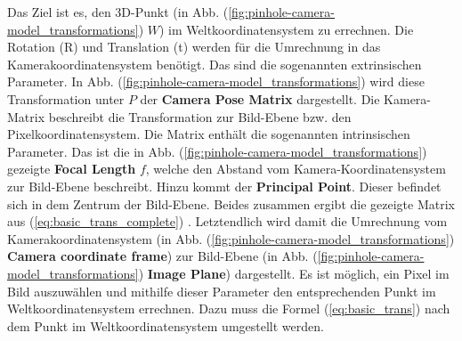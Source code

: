 	Das Ziel ist es, den 3D-Punkt (in Abb. (\ref{fig:pinhole-camera-model_transformations}) \( W \)) im Weltkoordinatensystem zu errechnen. Die Rotation (R) und Translation (t) werden für die Umrechnung in das Kamerakoordinatensystem benötigt. Das sind die sogenannten extrinsischen Parameter. In Abb. (\ref{fig:pinhole-camera-model_transformations}) wird diese Transformation unter \( P \) der \textbf{Camera Pose Matrix} dargestellt. \newline
	Die Kamera-Matrix beschreibt die Transformation zur Bild-Ebene bzw. den Pixelkoordinatensystem. Die Matrix enthält die sogenannten intrinsischen Parameter. Das ist die in Abb. (\ref{fig:pinhole-camera-model_transformations}) gezeigte \textbf{Focal Length} \( f \), welche den Abstand vom Kamera-Koordinatensystem zur Bild-Ebene beschreibt. Hinzu kommt der \textbf{Principal Point}. Dieser befindet sich in dem Zentrum der Bild-Ebene. Beides zusammen ergibt die gezeigte Matrix aus (\ref{eq:basic_trans_complete}) \citep[vgl.][]{noauthor_opencv_nodate-1}. Letztendlich wird damit die Umrechnung vom Kamerakoordinatensystem (in Abb. (\ref{fig:pinhole-camera-model_transformations}) \textbf{Camera coordinate frame}) zur Bild-Ebene (in Abb. (\ref{fig:pinhole-camera-model_transformations}) \textbf{Image Plane}) dargestellt. \newline 
	Es ist möglich, ein Pixel im Bild auszuwählen und mithilfe dieser Parameter den entsprechenden Punkt im Weltkoordinatensystem errechnen. Dazu muss die Formel (\ref{eq:basic_trans}) nach dem Punkt im Weltkoordinatensystem umgestellt werden.
	
